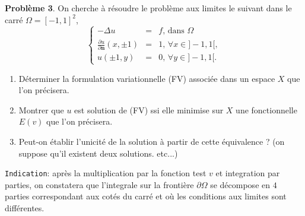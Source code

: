 \documentclass[12pt,a4paper]{article}
\begin{document}
{\bf Probl\`eme 3}. On cherche \`a r\'esoudre le probl\`eme aux
limites le suivant dans le carr\'e $\Omega=[-1,1]^2$, 
\begin{equation}\label{eq:tube}
\left\{\begin{array}{lcl}
-\Delta u &=& f,\,\text{dans }\Omega\\
\frac{\partial u}{\partial \mathbf{n}}(x,\pm 1)&=&1,\,\forall x\in ]-1,1[,\\
u(\pm 1,y)&=&0,\,\forall y\in  ]-1,1[.
\end{array}\right.
\end{equation}
\begin{enumerate}
\item D\'eterminer la formulation variationnelle (FV) associ\'ee dans un
  espace $X$ que l'on pr\'ecisera.
\item Montrer que $u$ est solution de (FV) ssi elle minimise sur $X$ une fonctionnelle $E(v)$ que l'on pr\'ecisera.
\item Peut-on \'etablir l'unicit\'e de la solution \`a partir de cette
  \'equivalence ? (on suppose qu'il existent deux solutions. etc...)
\end{enumerate}
 \texttt{Indication}: apr\`es la
  multiplication par la fonction test $v$ et integration par parties,
  on constatera que l'integrale sur la fronti\`ere $\partial\Omega$
  se d\'ecompose en $4$ parties correspondant aux cot\'es du carr\'e
  et o\`u les conditions aux limites sont diff\'erentes.\\
\end{document}
